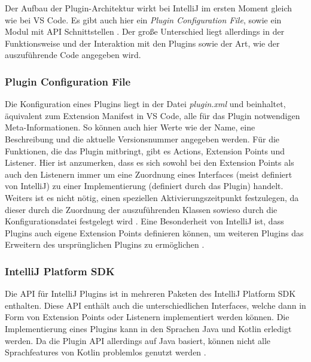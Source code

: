 Der Aufbau der Plugin-Architektur wirkt bei IntelliJ im ersten Moment 
gleich wie bei VS Code. Es gibt auch hier ein \emph{Plugin Configuration File}, 
sowie ein Modul mit API Schnittstellen \cite{IntelliJPlatformSDKPluginStructure}.
Der große Unterschied liegt allerdings in der Funktionsweise und der Interaktion
mit den Plugins sowie der Art, wie der auszuführende Code angegeben wird.
\subsubsection{Plugin Configuration File}
  Die Konfiguration eines Plugins liegt in der Datei \emph{plugin.xml} und
  beinhaltet, äquivalent zum Extension Manifest in VS Code, alle für das Plugin
  notwendigen Meta-Informationen. So können auch hier Werte wie der Name,
  eine Beschreibung und die aktuelle Versionsnummer angegeben werden.
  Für die Funktionen, die das Plugin mitbringt, gibt es Actions, Extension Points
  und Listener. Hier ist anzumerken, dass es sich sowohl bei den Extension Points
  als auch den Listenern immer um eine Zuordnung eines Interfaces
  (meist definiert von IntelliJ) zu einer Implementierung (definiert durch das Plugin)
  handelt. Weiters ist es nicht nötig, einen speziellen Aktivierungszeitpunkt
  festzulegen, da dieser durch die Zuordnung der auszuführenden Klassen sowieso durch 
  die Konfigurationsdatei festgelegt wird \cite{IntelliJPlatformSDKPluginConfigurationFile}. 
  Eine Besonderheit von IntelliJ ist,
  dass Plugins auch eigene Extension Points definieren können, um weiteren Plugins
  das Erweitern des ursprünglichen Plugins zu ermöglichen
  \cite{IntelliJPlatformSDKExtensionPoints}.
\subsubsection{IntelliJ Platform SDK}
  Die API für IntelliJ Plugins ist in mehreren Paketen des IntelliJ 
  Platform SDK enthalten. Diese API enthält auch die unterschiedlichen
  Interfaces, welche dann in Form von Extension Points oder Listenern implementiert
  werden können. Die Implementierung eines Plugins kann in den Sprachen Java
  und Kotlin erledigt werden. Da die Plugin API allerdings auf Java basiert, können
  nicht alle Sprachfeatures von Kotlin problemlos genutzt werden 
  \cite{IntelliJPlatformSDKConfiguringKotlinSupport}.
